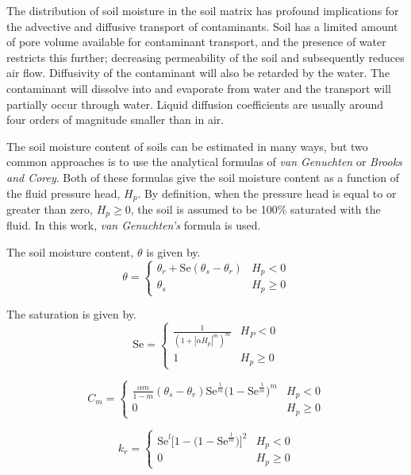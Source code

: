 The distribution of soil moisture in the soil matrix has profound implications for the advective and diffusive transport of contaminants.
Soil has a limited amount of pore volume available for contaminant transport, and the presence of water restricts this further; decreasing permeability of the soil and subsequently reduces air flow.
Diffusivity of the contaminant will also be retarded by the water.
The contaminant will dissolve into and evaporate from water and the transport will partially occur through water.
Liquid diffusion coefficients are usually around four orders of magnitude smaller than in air.

The soil moisture content of soils can be estimated in many ways, but two common approaches is to use the analytical formulas of \textit{van Genuchten} or \textit{Brooks and Corey}.
Both of these formulas give the soil moisture content as a function of the fluid pressure head, $H_p$.
By definition, when the pressure head is equal to or greater than zero, $H_p \geq 0$, the soil is assumed to be 100\% saturated with the fluid.
In this work, \textit{van Genuchten's} formula is used.

The soil moisture content, $\theta$ is given by.
\begin{equation}
  \theta = \begin{cases}
    \theta_r + \mathrm{Se}(\theta_s - \theta_r) & H_p < 0 \\
    \theta_s & H_p \geq 0
\end{cases}
\end{equation}

The saturation is given by.
\begin{equation}
  \mathrm{Se} = \begin{cases}
    \frac{1}{(1 + |\alpha H_p|^m)^m} & H_P < 0 \\
    1 & H_p \geq 0
  \end{cases}
\end{equation}

\begin{equation}
  C_m = \begin{cases}
    \frac{\alpha m}{1-m}(\theta_s - \theta_r)\mathrm{Se}^{\frac{1}{m}}\big( 1 - \mathrm{Se}^{\frac{1}{m}} \big)^m & H_p < 0 \\
    0 & H_p \geq 0
  \end{cases}
\end{equation}

\begin{equation}
  k_r = \begin{cases}
    \mathrm{Se}^l \big[ 1 - \big( 1 - \mathrm{Se}^\frac{1}{m} \big) \big]^2 & H_p < 0 \\
    0 & H_p \geq 0
  \end{cases}
\end{equation}
